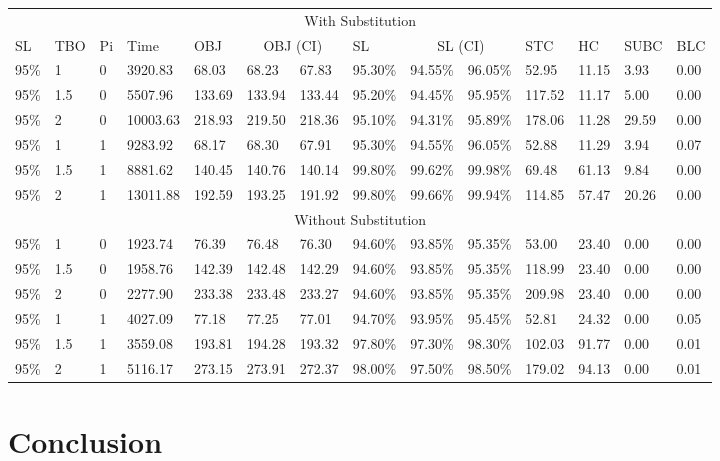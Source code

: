 \documentclass[10pt]{article}
\begin{document}
\begin{table}[]
\begin{tabular}{llllllllllllll}
\multicolumn{14}{c}{With Substitution} \\
SL & TBO & Pi & Time & OBJ & \multicolumn{2}{c}{OBJ (CI)} & SL & \multicolumn{2}{c}{SL (CI)} & STC & HC & SUBC & BLC \\
95\% & 1 & 0 & 3920.83 & 68.03 & 68.23 & 67.83 & 95.30\% & 94.55\% & 96.05\% & 52.95 & 11.15 & 3.93 & 0.00 \\
95\% & 1.5 & 0 & 5507.96 & 133.69 & 133.94 & 133.44 & 95.20\% & 94.45\% & 95.95\% & 117.52 & 11.17 & 5.00 & 0.00 \\
95\% & 2 & 0 & 10003.63 & 218.93 & 219.50 & 218.36 & 95.10\% & 94.31\% & 95.89\% & 178.06 & 11.28 & 29.59 & 0.00 \\
95\% & 1 & 1 & 9283.92 & 68.17 & 68.30 & 67.91 & 95.30\% & 94.55\% & 96.05\% & 52.88 & 11.29 & 3.94 & 0.07 \\
95\% & 1.5 & 1 & 8881.62 & 140.45 & 140.76 & 140.14 & 99.80\% & 99.62\% & 99.98\% & 69.48 & 61.13 & 9.84 & 0.00 \\
95\% & 2 & 1 & 13011.88 & 192.59 & 193.25 & 191.92 & 99.80\% & 99.66\% & 99.94\% & 114.85 & 57.47 & 20.26 & 0.00 \\
\multicolumn{14}{c}{Without Substitution} \\
95\% & 1 & 0 & 1923.74 & 76.39 & 76.48 & 76.30 & 94.60\% & 93.85\% & 95.35\% & 53.00 & 23.40 & 0.00 & 0.00 \\
95\% & 1.5 & 0 & 1958.76 & 142.39 & 142.48 & 142.29 & 94.60\% & 93.85\% & 95.35\% & 118.99 & 23.40 & 0.00 & 0.00 \\
95\% & 2 & 0 & 2277.90 & 233.38 & 233.48 & 233.27 & 94.60\% & 93.85\% & 95.35\% & 209.98 & 23.40 & 0.00 & 0.00 \\
95\% & 1 & 1 & 4027.09 & 77.18 & 77.25 & 77.01 & 94.70\% & 93.95\% & 95.45\% & 52.81 & 24.32 & 0.00 & 0.05 \\
95\% & 1.5 & 1 & 3559.08 & 193.81 & 194.28 & 193.32 & 97.80\% & 97.30\% & 98.30\% & 102.03 & 91.77 & 0.00 & 0.01 \\
95\% & 2 & 1 & 5116.17 & 273.15 & 273.91 & 272.37 & 98.00\% & 97.50\% & 98.50\% & 179.02 & 94.13 & 0.00 & 0.01
\end{tabular}
\end{table}

\section{Conclusion}
\end{document}
